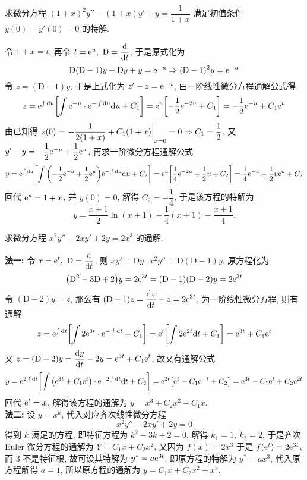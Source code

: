 \begin{example}
    求微分方程 $(1+x)^2y''-(1+x)y'+y=\dfrac{1}{1+x}$ 满足初值条件 $y(0)=y'(0)=0$ 的特解.
\end{example}
\begin{solution}
    令 $1+x=t$, 再令 $t=\mathrm{e} ^u,~\mathrm{D}=\displaystyle\dv{t}$, 于是原式化为
    $$\mathrm{D}(\mathrm{D}-1)y-\mathrm{D}y+y=\mathrm{e} ^{-u}\Rightarrow (\mathrm{D}-1)^2y=\mathrm{e} ^{-u}$$
    令 $z=(\mathrm{D}-1)y$, 于是上式化为 $z'-z=\mathrm{e} ^{-u}$, 由一阶线性微分方程通解公式得
    $$z=\mathrm{e} ^{\int\dd u}\qty[\int\mathrm{e} ^{-u}\cdot\mathrm{e} ^{-\int\dd u}\dd u+C_1]=\mathrm{e} ^u\qty[-\dfrac{1}{2}\mathrm{e} ^{-2u}+C_1]=-\dfrac{1}{2}\mathrm{e} ^{-u}+C_1\mathrm{e} ^u$$
    由已知得 $z(0)=\eval{-\dfrac{1}{2(1+x)}+C_1(1+x)}_{x=0}=0\Rightarrow C_1=\dfrac{1}{2}$, 又 $y'-y=-\dfrac{1}{2}\mathrm{e} ^{-u}+\dfrac{1}{2}\mathrm{e} ^u$, 再求一阶微分方程通解公式
    $$y=\mathrm{e} ^{\int\dd u}\qty[\int\qty(-\dfrac{1}{2}\mathrm{e} ^{-u}+\dfrac{1}{2}\mathrm{e} ^u)\mathrm{e} ^{-\int\dd u}\dd u+C_2]=\mathrm{e} ^u\qty[\dfrac{1}{4}\mathrm{e} ^{-2u}+\dfrac{1}{2}u+C_2]=\dfrac{1}{4}\mathrm{e} ^{-u}+\dfrac{1}{2}u\mathrm{e} ^u+C_2$$
    回代 $\mathrm{e} ^u=1+x$, 并 $y(0)=0$, 解得 $C_2=-\dfrac{1}{4}$, 于是该方程的特解为 $$y=\dfrac{x+1}{2}\ln(x+1)+\dfrac{1}{4}(x+1)-\dfrac{x+1}{4}.$$
\end{solution}

\begin{example}
    \label{x2y2xy2y2x3}求微分方程 $x^2y''-2xy'+2y=2x^3$ 的通解.
\end{example}
\begin{solution}
    \textbf{法一: }令 $\displaystyle x=\mathrm{e} ^t,~\mathrm{D}=\dv{t}$, 则 $xy'=\mathrm{D}y,~x^2y''=\mathrm{D}(\mathrm{D}-1)y$,
    原方程化为 $$\qty(\mathrm{D}^2-3\mathrm{D}+2)y=2\mathrm{e} ^{3t}=(\mathrm{D}-1)(\mathrm{D}-2)y=2\mathrm{e} ^{3t}$$
    令 $(\mathrm{D}-2)y=z$, 那么有 $\displaystyle(\mathrm{D}-1)z=\dv{z}{t}-z=2\mathrm{e} ^{3t}$, 为一阶线性微分方程, 则有通解
    $$z=\mathrm{e} ^{\int\dd t}\qty[\int 2\mathrm{e} ^{3t}\cdot\mathrm{e} ^{-\int\dd t}+C_1]=\mathrm{e} ^t\qty[\int 2\mathrm{e} ^{2t}\dd t+C_1]=\mathrm{e} ^{3t}+C_1\mathrm{e} ^t$$
    又 $z=(\mathrm{D}-2)y=\displaystyle\dv{y}{t}-2y=\mathrm{e} ^{3t}+C_1\mathrm{e} ^t$, 故又有通解公式
    $$y=\mathrm{e} ^{2\int\dd t}\qty[\int\qty(\mathrm{e} ^{3t}+C_1\mathrm{e} ^t)\cdot\mathrm{e} ^{-2\int\dd t}\dd t+C_2]=\mathrm{e} ^{2t}\qty[\mathrm{e} ^t-C_1\mathrm{e} ^{-t}+C_2]=\mathrm{e} ^{3t}-C_1\mathrm{e} ^t+C_2\mathrm{e} ^{2t}$$
    回代 $\mathrm{e} ^t=x$, 解得该方程的通解为 $y=x^3+C_2x^2-C_1x.$\\
    \textbf{法二: }设 $y=x^k$, 代入对应齐次线性微分方程 $$x^2y''-2xy'+2y=0$$
    得到 $k$ 满足的方程, 即特征方程为 $k^2-3k+2=0$, 解得 $k_1=1,~k_2=2$, 于是齐次 Euler 微分方程的通解为 $Y=C_1x+C_2x^2$,
    又因为 $f(x)=2x^3$ 于是 $f\qty(\mathrm{e} ^t)=2\mathrm{e} ^{3t}$, 而 3 不是特征根, 故可设其特解为 $y^*=a\mathrm{e} ^{3t}$, 即原方程的特解为 $y^*=ax^3$, 代入原方程解得 $a=1$, 所以原方程的通解为 $y=C_1x+C_2x^2+x^3.$
\end{solution}

